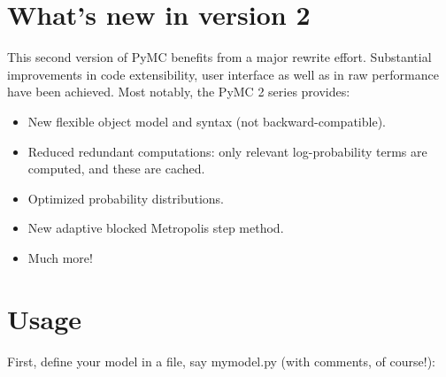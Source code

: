 \documentclass[letterpaper,10pt,english]{sphinxmanual}
\begin{document}
\section{What's new in version 2}
\label{README:what-s-new-in-version-2}
This second version of PyMC benefits from a major rewrite effort.
Substantial improvements in code extensibility, user interface as well
as in raw performance have been achieved. Most notably, the PyMC 2 series
provides:
\begin{itemize}
\item {} 
New flexible object model and syntax (not backward-compatible).

\item {} 
Reduced redundant computations: only relevant log-probability terms are
computed, and these are cached.

\item {} 
Optimized probability distributions.

\item {} 
New adaptive blocked Metropolis step method.

\item {} 
Much more!

\end{itemize}


\section{Usage}
\label{README:usage}
First, define your model in a file, say mymodel.py (with comments, of course!):
\end{document}
